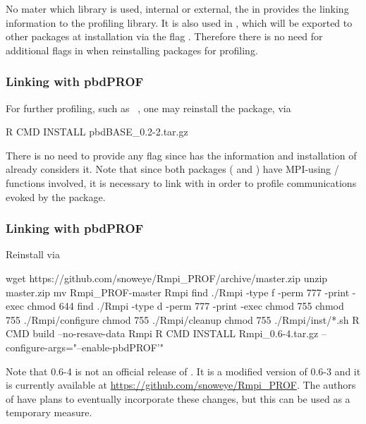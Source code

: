 No mater which library is used, internal or external, the 
in  provides the linking information to the
profiling library. It is also used in , which will be
exported to other  packages at installation via the flag
.  Therefore there is no need for additional flags in
 when reinstalling packages for profiling.



\subsubsection{Linking  with pbdPROF}
\label{sec:pbdBASE}

For further profiling, such as ~\citep{Schmidt2012pbdBASEpackage}, one may
reinstall the package, via
\begin{Command}
R CMD INSTALL pbdBASE_0.2-2.tar.gz
\end{Command}
There is no need to provide any flag since  has the
information and installation of  already considers it.
Note that since both packages ( and )
have MPI-using / functions involved, it
is necessary to link with  in order to profile communications
evoked by the package.



\subsubsection{Linking  with pbdPROF}
\label{sec:Rmpi}

Reinstall  via
\begin{Command}
wget https://github.com/snoweye/Rmpi_PROF/archive/master.zip
unzip master.zip
mv Rmpi_PROF-master Rmpi
find ./Rmpi -type f -perm 777 -print -exec chmod 644 {} \;
find ./Rmpi -type d -perm 777 -print -exec chmod 755 {} \;
chmod 755 ./Rmpi/configure
chmod 755 ./Rmpi/cleanup
chmod 755 ./Rmpi/inst/*.sh
R CMD build --no-resave-data Rmpi
R CMD INSTALL Rmpi_0.6-4.tar.gz --configure-args="--enable-pbdPROF'"
\end{Command}
Note that {\color{red} 0.6-4} is not an official release of .
It is a modified version of 0.6-3 and it is currently available at
\url{https://github.com/snoweye/Rmpi_PROF}.  The authors of  have plans 
to eventually incorporate these changes, but this can be used as a temporary 
measure.






